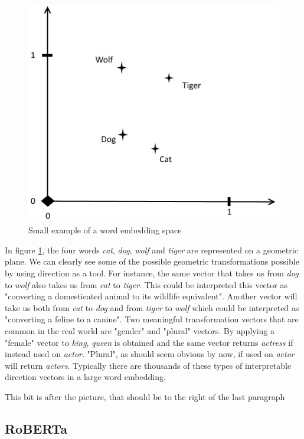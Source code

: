 \documentclass[nofilelist]{cslthse-msc}
\begin{document}
\begin{figure}
\includegraphics[width=0.9\linewidth]{msccls/explanatory_images/embedding_direction.png} 
\caption{Small example of a word embedding space}
\label{fig:direction}
\end{figure}


In figure \ref{fig:direction}, the four words \textit{cat}, \textit{dog}, \textit{wolf} and \textit{tiger} are represented on a geometric plane. We can clearly see some of the possible geometric transformations possible by using direction as a tool. For instance, the same vector that takes us from \textit{dog} to \textit{wolf} also takes us from \textit{cat} to \textit{tiger}. This could be interpreted this vector as "converting a domesticated animal to its wildlife equivalent". Another vector will take us both from \textit{cat} to \textit{dog} and from \textit{tiger} to \textit{wolf} which could be interpreted as "converting a feline to a canine". Two meaningful transformation vectors that are common in the real world are "gender" and "plural" vectors. By applying a "female" vector to \textit{king}, \textit{queen} is obtained and the same vector returns \textit{actress} if instead used on \textit{actor}. "Plural", as should seem obvious by now, if used on \textit{actor} will return \textit{actors}. Typically there are thousands of these types of interpretable direction vectors in a large word embedding.


This bit is after the picture, that should be to the right of the last paragraph

\subsection{RoBERTa}
\end{document}

